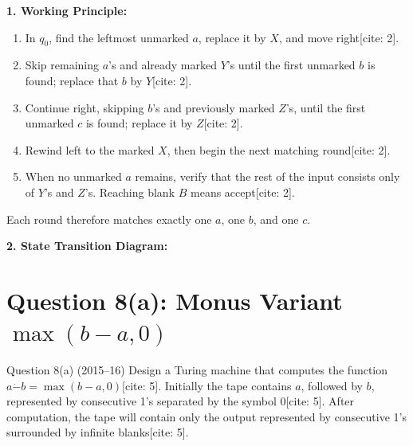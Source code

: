 \documentclass[11pt,a4paper]{article}
\begin{document}
\begin{solutionbox}
\textbf{1. Working Principle:}
\begin{enumerate}[leftmargin=*]
    \item In $q_0$, find the leftmost unmarked $a$, replace it by $X$, and move right[cite: 2].
    \item Skip remaining $a$'s and already marked $Y$'s until the first unmarked $b$ is found; replace that $b$ by $Y$[cite: 2].
    \item Continue right, skipping $b$'s and previously marked $Z$'s, until the first unmarked $c$ is found; replace it by $Z$[cite: 2].
    \item Rewind left to the marked $X$, then begin the next matching round[cite: 2].
    \item When no unmarked $a$ remains, verify that the rest of the input consists only of $Y$'s and $Z$'s. Reaching blank $B$ means accept[cite: 2].
\end{enumerate}
Each round therefore matches exactly one $a$, one $b$, and one $c$.

\textbf{2. State Transition Diagram:}
\begin{center}
\end{center}
\end{solutionbox}

\section{Question 8(a): Monus Variant $\max(b-a, 0)$}
\begin{questionbox}{Question 8(a) (2015--16)}
Design a Turing machine that computes the function $a \dot{-} b = \max(b - a, 0)$[cite: 5]. Initially the tape contains $a$, followed by $b$, represented by consecutive 1's separated by the symbol 0[cite: 5]. After computation, the tape will contain only the output represented by consecutive 1's surrounded by infinite blanks[cite: 5].
\end{questionbox}
\end{document}
